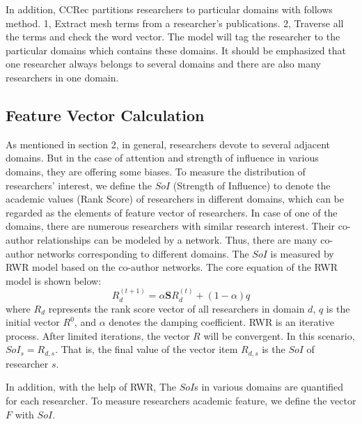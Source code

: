 \documentclass{acm_proc_article-sp}
\begin{document}
In addition, CCRec partitions researchers to particular domains with follows method. 1, Extract mesh terms from a researcher's publications. 2, Traverse all the terms and check the word vector. The model will tag the researcher to the particular domains which contains these domains. It should be emphasized that one researcher always belongs to several domains and there are also many researchers in one domain.

\subsection{Feature Vector Calculation}
As mentioned in section 2, in general, researchers devote to several adjacent domains. But in the case of attention and strength of influence in various domains, they are offering some biases. To measure the distribution of researchers' interest, we define the $SoI$ (Strength of Influence) to denote the academic values (Rank Score) of researchers in different domains, which can be regarded as the elements of feature vector of researchers. In case of one of the domains, there are numerous researchers with similar research interest. Their co-author relationships can be modeled by a network. Thus, there are many co-author networks corresponding to different domains. The $SoI$ is measured by RWR model based on the co-author networks. The core equation of the RWR model is shown below:
\begin{equation}
R_{d}^{(t+1)}=\alpha \mathbf{S}R_{d}^{(t)}+(1-\alpha)q
\end{equation}
where $R_{d}$ represents the rank score vector of all researchers in domain $d$, $q$ is the initial vector $R^0$, and $\alpha$ denotes the damping coefficient. RWR is an iterative process. After limited iterations, the vector $R$ will be convergent. In this scenario, $SoI_{s}=R_{d,s}$. That is, the final value of the vector item $R_{d,s}$ is the $SoI$ of researcher $s$.

In addition, with the help of RWR, The $SoI$s in various domains are quantified for each researcher. To measure researchers academic feature, we define the vector $F$ with $SoI$.
\end{document}
